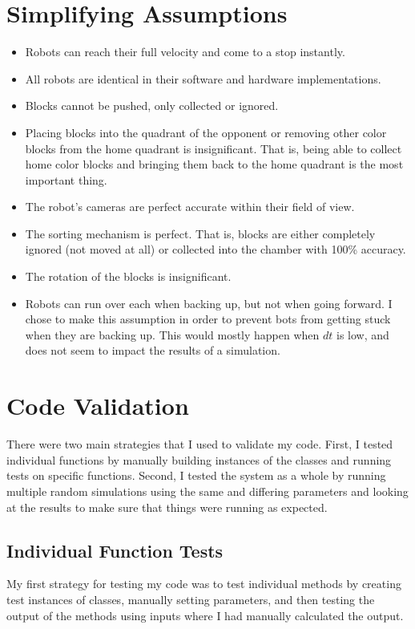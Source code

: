 \documentclass[12pt]{article}
\begin{document}
\section{Simplifying Assumptions}
\begin{itemize}
  \item Robots can reach their full velocity and come to a stop instantly.
  \item All robots are identical in their software and hardware implementations.
  \item Blocks cannot be pushed, only collected or ignored.
  \item Placing blocks into the quadrant of the opponent or removing other color blocks from the home quadrant is insignificant. That is, being able to collect home color blocks and bringing them back to the home quadrant is the most important thing.
  \item The robot's cameras are perfect accurate within their field of view.
  \item The sorting mechanism is perfect. That is, blocks are either completely ignored (not moved at all) or collected into the chamber with 100\% accuracy.
  \item The rotation of the blocks is insignificant.
  \item Robots can run over each when backing up, but not when going forward. I chose to make this assumption in order to prevent bots from getting stuck when they are backing up. This would mostly happen when $dt$ is low, and does not seem to impact the results of a simulation.
\end{itemize}

\section{Code Validation}
There were two main strategies that I used to validate my code. First, I tested individual functions by manually building instances of the classes and running tests on specific functions. Second, I tested the system as a whole by running multiple random simulations using the same and differing parameters and looking at the results to make sure that things were running as expected.

\subsection{Individual Function Tests}
My first strategy for testing my code was to test individual methods by creating test instances of classes, manually setting parameters, and then testing the output of the methods using inputs where I had manually calculated the output.
\end{document}
